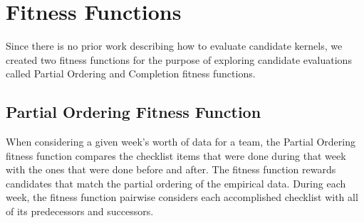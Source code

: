 \documentclass[preprint,12pt,3p]{elsarticle}
\begin{document}
\section{Fitness Functions}

Since there is no prior work describing how to evaluate candidate kernels, we created two fitness functions for the purpose of exploring candidate evaluations called Partial Ordering and Completion fitness functions. 
\subsection{Partial Ordering Fitness Function}
When considering a given week's worth of data for a team, the Partial Ordering fitness function compares the checklist items that were done during that week with the ones that were done before and after. The fitness function rewards candidates that match the partial ordering of the empirical data. During each week, the fitness function pairwise considers each accomplished checklist with all of its predecessors and successors. 



\end{document}
